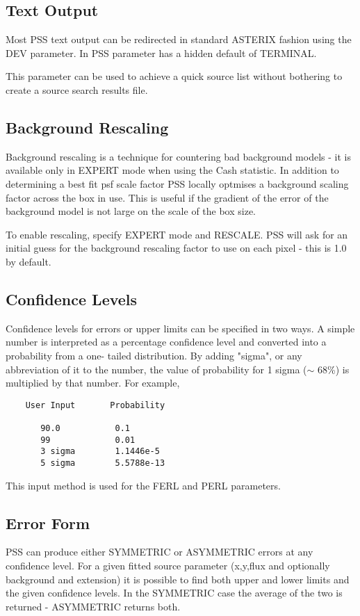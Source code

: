 \documentclass{book}
\renewcommand{\_}{{\tt\char'137}}     %
\begin{document}
\subsection{Text Output}
Most PSS text output can be redirected in standard ASTERIX
fashion using the DEV parameter. In PSS parameter has a hidden
default of TERMINAL.
 
This parameter can be used to achieve a quick source list without
bothering to create a source search results file.
\subsection{Background Rescaling}
Background rescaling is a technique for countering bad background
models - it is available only in EXPERT mode when using the Cash
statistic. In addition to determining a best fit psf scale factor
PSS locally optmises a background scaling factor across the box in
use. This is useful if the gradient of the error of the background
model is not large on the scale of the box size.
 
To enable rescaling, specify EXPERT mode and RESCALE. PSS will ask
for an initial guess for the background rescaling factor to use on
each pixel - this is 1.0 by default.
 
\subsection{Confidence Levels}
Confidence levels for errors or upper limits can be specified
in two ways. A simple number is interpreted as a percentage
confidence level and converted into a probability from a one-
tailed distribution. By adding "sigma", or any abbreviation
of it to the number, the value of probability for 1 sigma
($\sim$ 68\%) is multiplied by that number. For example,
 
\begin{verbatim}
    User Input       Probability
 
       90.0           0.1
       99             0.01
       3 sigma        1.1446e-5
       5 sigma        5.5788e-13
 \end{verbatim}
This input method is used for the FERL and PERL parameters.
 
\subsection{Error Form}
PSS can produce either SYMMETRIC or ASYMMETRIC errors at any
confidence level. For a given fitted source parameter (x,y,flux
and optionally background and extension) it is possible to find
both upper and lower limits and the given confidence levels. In
the SYMMETRIC case the average of the two is returned - ASYMMETRIC
returns both.
 
\end{document}
